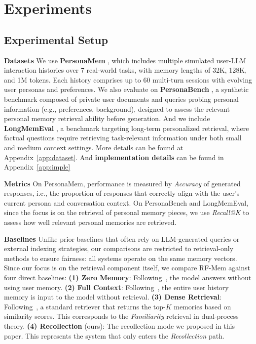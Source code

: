 \section{Experiments}
\subsection{Experimental Setup}
\textbf{Datasets}  
We use \textbf{PersonaMem} \citep{jiang2025know}, which includes multiple simulated user-LLM interaction histories over 7 real-world tasks, with memory lengths of 32K, 128K, and 1M tokens. 
Each history comprises up to 60 multi-turn sessions with evolving user personas and preferences. 
We also evaluate on \textbf{PersonaBench} \citep{tan2025personabench}, a synthetic benchmark composed of private user documents and queries probing personal information (e.g., preferences, background), designed to assess the relevant personal memory retrieval ability before generation. 
And we include \textbf{LongMemEval} \citep{wu2024longmemeval}, a benchmark targeting long-term personalized retrieval, where factual questions require retrieving task-relevant information under both small and medium context settings. More details can be found at Appendix~\ref{app:dataset}. And \textbf{implementation details} can be found in Appendix~\ref{app:imple}

\textbf{Metrics}  
On PersonaMem, performance is measured by \emph{Accuracy} of generated responses, {i.e.}, the proportion of responses that correctly align with the user’s current persona and conversation context. On PersonaBench and LongMemEval, since the focus is on the retrieval of personal memory pieces, we use \emph{Recall@K} to assess how well relevant personal memories are retrieved.

\textbf{Baselines}  
Unlike prior baselines that often rely on LLM-generated queries or external indexing strategies, our comparisons are restricted to retrieval-only methods to ensure fairness: all systems operate on the same memory vectors. Since our focus is on the retrieval component itself, we compare RF-Mem against four direct baselines: 
\textbf{(1) Zero Memory}: Following~\citep{pan2025secom,jiang2025know}, the model answers without using user memory.
\textbf{(2) Full Context}: Following~\citep{pan2025secom,jiang2025know}, the entire user history memory is input to the model without retrieval. 
\textbf{(3) Dense Retrieval}: Following~\citep{wu2024longmemeval,pan2025secom,zhong2024memorybank}, a standard retriever that returns the top-$K$ memories based on similarity scores. This corresponds to the \emph{Familiarity} retrieval in dual-process theory. 
\textbf{(4) Recollection} (ours): The recollection mode we proposed in this paper. This represents the system that only enters the \emph{Recollection} path.



